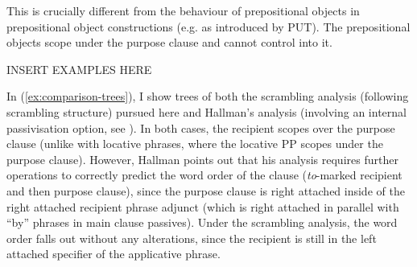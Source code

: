 \documentclass[11pt]{upenndiss}
\begin{document}
This is crucially different from the behaviour of prepositional objects in prepositional object constructions (e.g. as introduced by PUT). The prepositional objects scope under the purpose clause and cannot control into it.

INSERT EXAMPLES HERE

In (\ref{ex:comparison-trees}), I show trees of both the scrambling analysis (following \cite{McGinnis.1998} scrambling structure) pursued here and Hallman's analysis (involving an internal passivisation option, see \citet{Larson.1988}). In both cases, the recipient scopes over the purpose clause (unlike with locative phrases, where the locative PP scopes under the purpose clause). However, Hallman points out that his analysis requires further operations to correctly predict the word order of the clause (\textit{to}-marked recipient and then purpose clause), since the purpose clause is right attached inside of the right attached recipient phrase adjunct (which is right attached in parallel with ``by'' phrases in main clause passives). Under the scrambling analysis, the word order falls out without any alterations, since the recipient is still in the left attached specifier of the applicative phrase.
\end{document}
